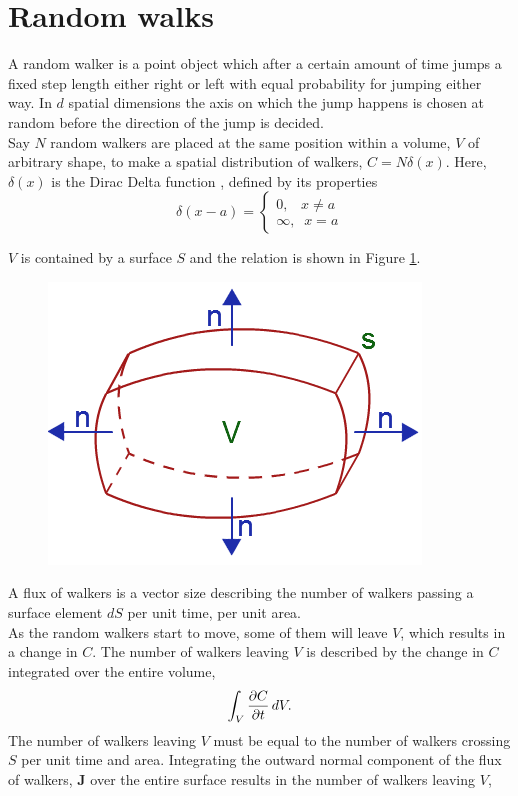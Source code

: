\section{Random walks}

A random walker is a point object which after a certain amount of time jumps a fixed step length either right or left with equal probability for jumping either way. 
In $d$ spatial dimensions the axis on which the jump happens is chosen at random before the direction of the jump is decided. \\
Say $N$ random walkers are placed at the same position within a volume, $V$ of arbitrary shape, to make a spatial distribution of walkers, $C = N\delta(x)$. 
Here, $\delta(x)$ is the Dirac Delta function \cite{boas2006mathematical}, defined by its properties
\begin{equation}
 \delta(x-a) = \begin{cases}
              0 ,\;\;\; x\neq a\\
              \infty,\;\; x=a
             \end{cases}
\end{equation}

\noindent $V$ is contained by a surface $S$ and the relation is shown in Figure \ref{theory:divergence_theorem}. 

\begin{figure}[H]
\centering
\includegraphics[scale=0.6]{Figures/divergence_theorem.png}
 \caption[]{}
 \label{theory:divergence_theorem}
\end{figure}

\noindent A flux of walkers is a vector size describing the number of walkers passing a surface element $dS$ per unit time, per unit area. \\

\noindent As the random walkers start to move, some of them will leave $V$, which results in a change in $C$. 
The number of walkers leaving $V$ is described by the change in $C$ integrated over the entire volume,
\begin{equation}
 \int_V \frac{\partial C}{\partial t}\,dV.
\end{equation}
The number of walkers leaving $V$ must be equal to the number of walkers crossing $S$ per unit time and area. Integrating the outward normal component of the flux of walkers, $\mathbf{J}$ over the entire surface results in the number of walkers leaving $V$,

